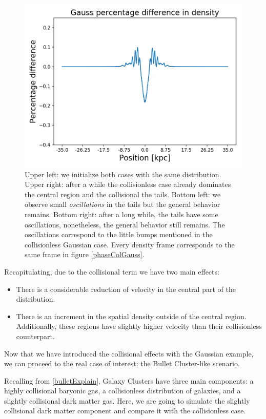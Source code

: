 \begin{figure}[h!]
    \includegraphics[scale=0.45]{imag/cGaussD62.png}
    \caption{Upper left: we initialize both cases with the same distribution. Upper right: after a while the collisionless case already dominates the central region and the collisional the tails. Bottom left: we observe small \emph{oscillations} in the tails but the general behavior remains. Bottom right: after a long while, the tails have some oscillations, nonetheless, the general behavior still remains. The oscillations correspond to the little bumps mentioned in the collisionless Gaussian case. Every density frame corresponds to the same frame in figure \ref{phaseColGauss}.}
    \label{densColGauss}
\end{figure}

Recapitulating, due to the collisional term we have two main effects:
\begin{itemize}
\item There is a considerable reduction of velocity in the central part of the distribution.
\item There is an increment in the spatial density outside of the central region. Additionally, these regions have slightly higher velocity than their collisionless counterpart.
\end{itemize}

Now that we have introduced the collisional effects with the Gaussian example, we can proceed to the real case of interest: the Bullet Cluster-like scenario. 

Recalling from \ref{bulletExplain}, Galaxy Clusters have three main components: a highly collisional baryonic gas, a collisionless distribution of galaxies, and a slightly collisional dark matter gas. Here, we are going to simulate the slightly collisional dark matter component and compare it with the collisionless case.%

